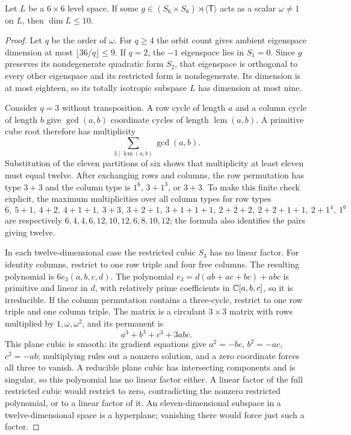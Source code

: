 \begin{theorem}\label{thm:scalar-six}
Let $L$ be a $6\times6$ level space. If some $g\in(S_6\times S_6)\rtimes\langle\mathsf T\rangle$ acts as a scalar $\omega\ne1$ on $L$, then $\dim L\leq10$.
\end{theorem}
\begin{proof}
Let $q$ be the order of $\omega$. For $q\geq4$ the orbit count gives ambient eigenspace dimension at most $\lfloor36/q\rfloor\leq9$. If $q=2$, the $-1$ eigenspace lies in $S_1=0$. Since $g$ preserves its nondegenerate quadratic form $S_2$, that eigenspace is orthogonal to every other eigenspace and its restricted form is nondegenerate. Its dimension is at most eighteen, so its totally isotropic subspace $L$ has dimension at most nine.

Consider $q=3$ without transposition. A row cycle of length $a$ and a column cycle of length $b$ give $\gcd(a,b)$ coordinate cycles of length $\operatorname{lcm}(a,b)$. A primitive cube root therefore has multiplicity
\[
 \sum_{3\mid\operatorname{lcm}(a,b)}\gcd(a,b).
\]
Substitution of the eleven partitions of six shows that multiplicity at least eleven must equal twelve. After exchanging rows and columns, the row permutation has type $3+3$ and the column type is $1^6$, $3+1^3$, or $3+3$. To make this finite check explicit, the maximum multiplicities over all column types for row types
\[
 6,\ 5+1,\ 4+2,\ 4+1+1,\ 3+3,\ 3+2+1,
 \ 3+1+1+1,\ 2+2+2,\ 2+2+1+1,\ 2+1^4,\ 1^6
\]
are respectively $6,4,4,6,12,10,12,6,8,10,12$; the formula also identifies the pairs giving twelve.

In each twelve-dimensional case the restricted cubic $S_3$ has no linear factor. For identity columns, restrict to one row triple and four free columns. The resulting polynomial is $6e_3(a,b,c,d)$. The polynomial $e_3=d(ab+ac+bc)+abc$ is primitive and linear in $d$, with relatively prime coefficients in $\mathbb C[a,b,c]$, so it is irreducible. If the column permutation contains a three-cycle, restrict to one row triple and one column triple. The matrix is a circulant $3\times3$ matrix with rows multiplied by $1,\omega,\omega^2$, and its permanent is
\[
 a^3+b^3+c^3+3abc.
\]
This plane cubic is smooth: its gradient equations give $a^2=-bc$, $b^2=-ac$, $c^2=-ab$; multiplying rules out a nonzero solution, and a zero coordinate forces all three to vanish. A reducible plane cubic has intersecting components and is singular, so this polynomial has no linear factor either. A linear factor of the full restricted cubic would restrict to zero, contradicting the nonzero restricted polynomial, or to a linear factor of it. An eleven-dimensional subspace in a twelve-dimensional space is a hyperplane; vanishing there would force just such a factor.


\end{proof}
